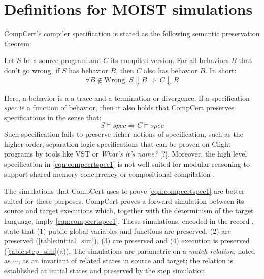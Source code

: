 \section{Definitions for MOIST simulations}\label{sec:compcert-sim}

CompCert's compiler specification is stated as the following semantic preservation theorem:
\begin{theorem}
Let $S$ be a source program and $C$ its compiled version. For all behaviors $B$ that don't go wrong, if $S$ has behavior $B$, then  
$C$ also has behavior $B$. In short:
\begin{equation}\forall B \not \in \text{Wrong}. \ S \Downarrow B \Rightarrow \ C \Downarrow B\label{eqn:compcertspec1}\end{equation}
\end{theorem}
Here, a behavior is a a trace and a termination or divergence. If a specification $spec$ is a function of behavior, then it also holds that CompCert preserves specifications in the sense that:
\begin{equation} S \models spec \Rightarrow C \models spec \end{equation}
Such specification fails to preserve richer notions of specification, such as the higher order, separation logic specifications that can be proven on Clight programs by tools like VST \cite{DBLP:journals/jar/CaoBGDA18} or \emph{What's it's name?} [?].%
Moreover, the high level specification in \cref{eqn:compcertspec1} is not well suited for modular reasoning to support shared memory concurrency or compositional compilation \cite{compcomp}. 

The simulations that CompCert uses to prove \cref{eqn:compcertspec1} are better suited for these purposes.
CompCert proves a forward simulation between its source and target executions which, together with the determinism of the target language, imply \cref{eqn:compcertspec1}. These simulations, encoded in the record , state that (1) public global variables and functions are preserved, (2)  are preserved (\cref{table:initial_sim}), (3)  are preserved and (4) execution is preserved (\cref{table:step_sim}(a)). The simulations are parametric on a \emph{match relation}, noted as $\overset{ }{\sim}$, as an invariant of related states in source and target; the relation is established at initial states and preserved by the step simulation. 

